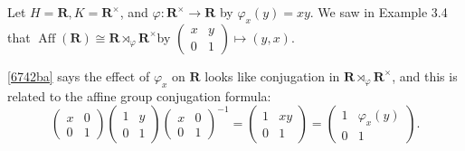 \begin{example}
Let $H=\mathbf{R}, K=\mathbf{R}^{\times}$, and $\varphi: \mathbf{R}^{\times} \rightarrow \mathbf{R}$ by $\varphi_x(y)=x y$. We saw in Example 3.4 that $\operatorname{Aff}(\mathbf{R}) \cong \mathbf{R} \rtimes_{\varphi} \mathbf{R}^{\times}$by $\left(\begin{array}{ll}x & y \\ 0 & 1\end{array}\right) \mapsto(y, x)$.
\end{example}
\cref{6742ba}  says the effect of $\varphi_x$ on $\mathbf{R}$ looks like conjugation in $\mathbf{R} \rtimes_{\varphi} \mathbf{R}^{\times}$, and this is related to the affine group conjugation formula:
\[
\left(\begin{array}{ll}
x & 0 \\
0 & 1
\end{array}\right)\left(\begin{array}{ll}
1 & y \\
0 & 1
\end{array}\right)\left(\begin{array}{ll}
x & 0 \\
0 & 1
\end{array}\right)^{-1}=\left(\begin{array}{cc}
1 & x y \\
0 & 1
\end{array}\right)=\left(\begin{array}{cc}
1 & \varphi_x(y) \\
0 & 1
\end{array}\right) .
\]
